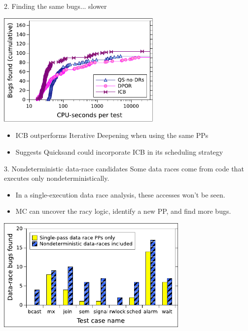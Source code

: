 \documentclass[xcolor=dvipsnames]{beamer}
\begin{document}
\begin{frame}{2. Finding the same bugs... slower}
	\begin{center}
		\includegraphics[width=0.6\textwidth]{eval2.pdf}
	\end{center}
	\begin{itemize}
		\item ICB outperforms Iterative Deepening when using the same PPs
		\item Suggests Quicksand could incorporate ICB in its scheduling strategy
	\end{itemize}
\end{frame}

\begin{frame}{3. Nondeterministic data-race candidates}
	Some data races come from code that executes only nondeterministically.
	\begin{itemize}
		\item In a single-execution data race analysis, these accesses won't be seen.
		\item MC can uncover the racy logic, identify a new PP, and find more bugs.
	\end{itemize}

	\begin{center}
		\includegraphics[width=0.7\textwidth]{eval3.pdf}
	\end{center}
\end{frame}
\end{document}
